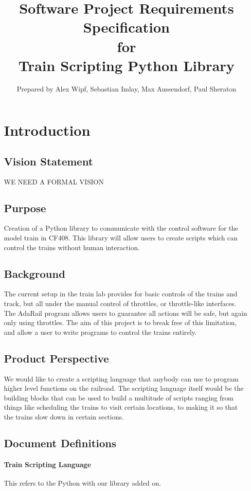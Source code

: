 \documentclass[a4paper,11pt,notitlepage]{article}
\title{{\bf Software Project Requirements Specification} \\ for \\ {\bf Train Scripting Python Library}}
\author{Prepared by Alex Wipf, Sebastian Imlay, Max Aussendorf, Paul Sheraton}
\def\TSL{Train Scripting Language\xspace}
\begin{document}
\maketitle
\pagebreak
\tableofcontents

\newpage
\section{Introduction}
\subsection{Vision Statement}
WE NEED A FORMAL VISION 
\subsection{Purpose} 
Creation of a Python library to communicate with the control software for the model train in CF408. This library will allow users to create scripts which can control the trains without human interaction.  
\subsection{Background} 
The current setup in the train lab provides for basic controls of the trains and track, but all under the manual control of throttles, or throttle-like interfaces. The AdaRail program allows users to guarantee all actions will be safe, but again only using throttles. The aim of this project is to break free of this limitation, and allow a user to write programs to control the trains entirely.
\subsection{Product Perspective}
We would like to create a scripting language that anybody can use to program higher level functions on the railroad. The scripting language itself would be the building blocks that can be used to build a multitude of scripts ranging from things like scheduling the trains to visit certain locations, to making it so that the trains slow down in certain sections.
\subsection{Document Definitions}
\paragraph{\TSL} This refers to the Python with our library added on.
\end{document}
